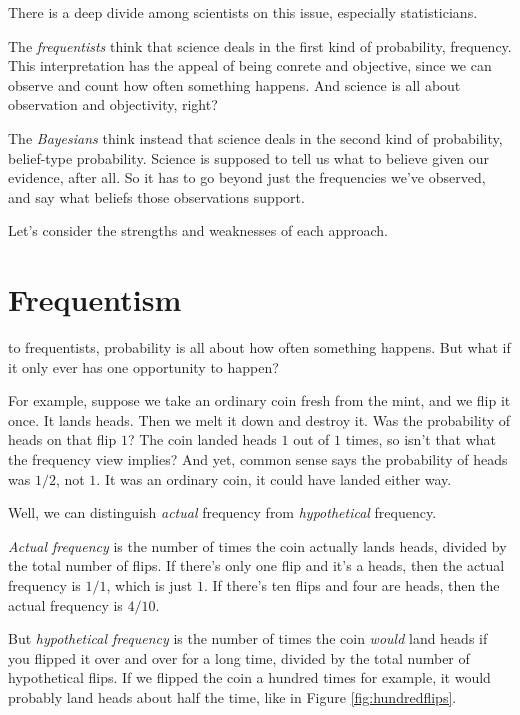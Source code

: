 \documentclass[justified]{tufte-book}
\theoremstyle{definition}
\theoremstyle{definition}
\theoremstyle{definition}
\theoremstyle{remark}
\begin{document}
There is a deep divide among scientists on this issue, especially statisticians.

The \emph{frequentists} think that science deals in the first kind of probability, frequency. This interpretation has the appeal of being conrete and objective, since we can observe and count how often something happens. And science is all about observation and objectivity, right?

The \emph{Bayesians} think instead that science deals in the second kind of probability, belief-type probability. Science is supposed to tell us what to believe given our evidence, after all. So it has to go beyond just the frequencies we've observed, and say what beliefs those observations support.

Let's consider the strengths and weaknesses of each approach.

\hypertarget{frequentism}{%
\section{Frequentism}\label{frequentism}}

 to frequentists, probability is all about how often something happens. But what if it only ever has one opportunity to happen?

For example, suppose we take an ordinary coin fresh from the mint, and we flip it once. It lands heads. Then we melt it down and destroy it. Was the probability of heads on that flip \(1\)? The coin landed heads \(1\) out of \(1\) times, so isn't that what the frequency view implies? And yet, common sense says the probability of heads was \(1/2\), not \(1\). It was an ordinary coin, it could have landed either way.

Well, we can distinguish \emph{actual} frequency from \emph{hypothetical} frequency.

\emph{Actual frequency} is the number of times the coin actually lands heads, divided by the total number of flips. If there's only one flip and it's a heads, then the actual frequency is \(1/1\), which is just \(1\). If there's ten flips and four are heads, then the actual frequency is \(4/10\).

But \emph{hypothetical frequency} is the number of times the coin \emph{would} land heads if you flipped it over and over for a long time, divided by the total number of hypothetical flips. If we flipped the coin a hundred times for example, it would probably land heads about half the time, like in Figure \ref{fig:hundredflips}.
\end{document}
